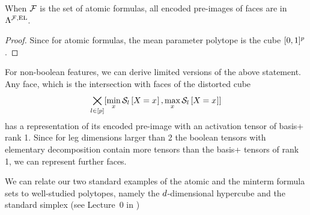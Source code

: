\begin{corollary}
    When $\mathcal{F}$ is the set of atomic formulas, all encoded pre-images of faces are in $\Lambda^{\mathcal{F},\mathrm{EL}}$.
\end{corollary}
\begin{proof}
    Since for atomic formulas, the mean parameter polytope is the cube $[0,1]^p$.
\end{proof}

For non-boolean features, we can derive limited versions of the above statement.
Any face, which is the intersection with faces of the distorted cube
\begin{align*}
    \bigtimes_{l\in[p]} [\min_{x}\mathcal{S}_{l}\left[X_{}=x_{}\right],\max_{x}\mathcal{S}_{l}\left[X_{}=x_{}\right]]
\end{align*}
has a representation of its encoded pre-image with an activation tensor of basis+ rank 1.
Since for leg dimensions larger than 2 the boolean tensors with elementary decomposition contain more tensors than the basis+ tensors of rank 1, we can represent further faces.







We can relate our two standard examples of the atomic and the minterm formula sets to well-studied polytopes, namely the $d$-dimensional hypercube and the standard simplex (see Lecture~0 in \cite{ziegler_lectures_2013} )

